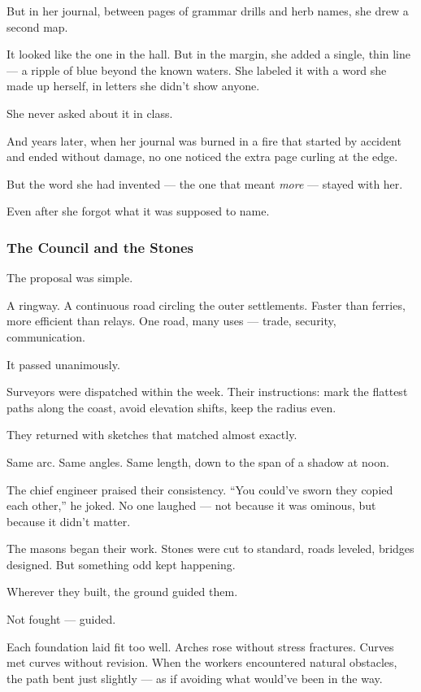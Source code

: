 \documentclass[12pt]{article}
\begin{document}
But in her journal, between pages of grammar drills and herb names, she drew a second map.

It looked like the one in the hall. But in the margin, she added a single, thin line — a ripple of blue beyond the known waters. She labeled it with a word she made up herself, in letters she didn’t show anyone.

She never asked about it in class.

And years later, when her journal was burned in a fire that started by accident and ended without damage, no one noticed the extra page curling at the edge.

But the word she had invented — the one that meant \emph{more} — stayed with her.

Even after she forgot what it was supposed to name.


\dotfill

\subsubsection*{The Council and the Stones}

The proposal was simple.

A ringway. A continuous road circling the outer settlements. Faster than ferries, more efficient than relays. One road, many uses — trade, security, communication.

It passed unanimously.

Surveyors were dispatched within the week. Their instructions: mark the flattest paths along the coast, avoid elevation shifts, keep the radius even.

They returned with sketches that matched almost exactly.

Same arc. Same angles. Same length, down to the span of a shadow at noon.

The chief engineer praised their consistency. ``You could’ve sworn they copied each other,'' he joked. No one laughed — not because it was ominous, but because it didn’t matter.

The masons began their work. Stones were cut to standard, roads leveled, bridges designed. But something odd kept happening.

Wherever they built, the ground guided them.

Not fought — guided.

Each foundation laid fit too well. Arches rose without stress fractures. Curves met curves without revision. When the workers encountered natural obstacles, the path bent just slightly — as if avoiding what would’ve been in the way.
\end{document}

